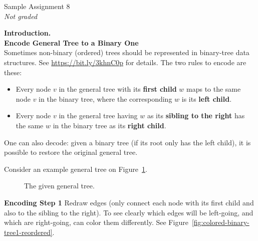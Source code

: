 \documentclass[a4paper,12pt]{article}
\begin{document}
\twocolumn

\thispagestyle{empty}

\begin{center}
{\Large Sample Assignment 8}\\
{\em Not graded} 
\end{center}

\noindent


\vspace{10pt} {\bf Introduction.}\\
{\bf Encode General Tree to a Binary One}\\

Sometimes non-binary (ordered) trees should be represented in 
binary-tree data structures. See \url{https://bit.ly/3khnC0p} for details. 
The two rules to encode are these:
\begin{itemize}
\item Every node $v$ in the general tree with
its {\bf first child} $w$ maps to the same node $v$ in the binary tree, 
where the corresponding $w$ is its {\bf left child}.
\item Every node $v$ in the general tree having $w$ as its {\bf sibling to the right} 
has the same $w$ in the binary tree as its {\bf right child}. 
\end{itemize}

One can also decode: given a binary tree (if its root only has the left child), 
it is possible to restore the original general tree.

Consider an example general tree on Figure~\ref{fig:general-tree-no-color}.

\begin{figure}[!htb]
\caption{\label{fig:general-tree-no-color} The given general tree.}
\end{figure}

{\bf Encoding Step 1} Redraw edges (only connect each node with its first child and also to 
the sibling to the right). To see clearly which edges will be left-going, and 
which are right-going, can color them differently. See
Figure~\ref{fig:colored-binary-tree1-reordered}. 
\end{document}
